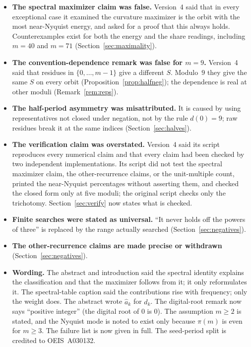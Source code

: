 \documentclass[12pt]{article}
\theoremstyle{remark}
\begin{document}
\begin{itemize}
\item \textbf{The spectral maximizer claim was false.} Version~4 said that in every
exceptional case it examined the curvature maximizer is the orbit with the most
near-Nyquist energy, and asked for a proof that this always holds. Counterexamples exist for both the energy
and the share readings, including $m=40$ and $m=71$ (Section~\ref{sec:maximality}).
\item \textbf{The convention-dependence remark was false for $m=9$.} Version~4 said that
residues in $\{0,\dots,m-1\}$ give a different $S$. Modulo~$9$ they give the same $S$ on
every orbit (Proposition~\ref{prop:halfneg}); the dependence is real at other moduli
(Remark~\ref{rem:reps}).
\item \textbf{The half-period asymmetry was misattributed.} It is caused by using
representatives not closed under negation, not by the rule $d(0)=9$; raw residues break
it at the same indices (Section~\ref{sec:halves}).
\item \textbf{The verification claim was overstated.} Version~4 said its script
reproduces every numerical claim and that every claim had been checked by two independent
implementations. Its script did not test the spectral maximizer claim, the
other-recurrence claims, or the unit-multiple count, printed the near-Nyquist percentages
without asserting them, and checked the closed form only at five moduli; the original
script checks only the trichotomy. Section~\ref{sec:verify} now
states what is checked.
\item \textbf{Finite searches were stated as universal.} ``It never holds off the powers
of three'' is replaced by the range actually searched (Section~\ref{sec:negatives}).
\item \textbf{The other-recurrence claims are made precise or withdrawn}
(Section~\ref{sec:negatives}).
\item \textbf{Wording.} The abstract and introduction said the spectral identity explains
the classification and that the maximizer follows from it; it only reformulates it. The
spectral-table caption said the contributions rise with frequency; only the weight does.
The abstract wrote $\hat a_k$ for $\hat d_k$. The digital-root remark now says
``positive integer'' (the digital root of $0$ is $0$). The assumption $m\ge 2$ is stated,
and the Nyquist mode is noted to exist only because $\pi(m)$ is even for $m\ge 3$. The
failure list is now given in full. The seed-period split is credited to OEIS~A030132.
\end{itemize}
\end{document}
